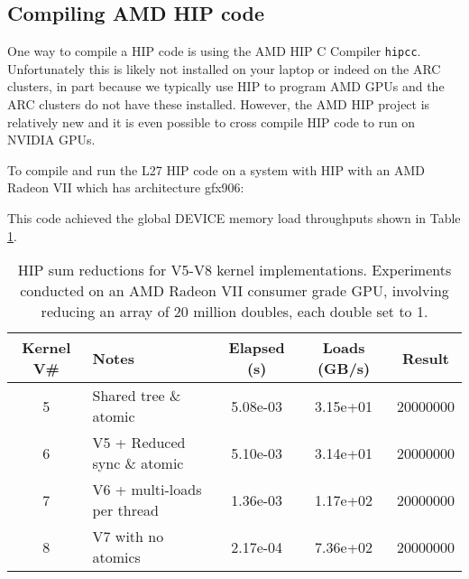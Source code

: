 \subsection{Compiling AMD HIP code}

One way to compile a HIP code is using the AMD HIP C Compiler \texttt{hipcc}. Unfortunately this is likely not installed on your laptop or indeed on the ARC clusters, in part because we typically use HIP to program AMD GPUs and the ARC clusters do not have these installed. However, the AMD HIP project is relatively new and it is even possible to cross compile HIP code to run on NVIDIA GPUs.

To compile and run the L27 HIP code on a system with HIP with an AMD Radeon VII which has architecture gfx906:

 
This code achieved the global DEVICE memory load throughputs shown in Table \ref{HIPreductionsPerformanceRadeonVII.tab}.  
\begin{table}[htbp!]
    \centering
    \begin{tabular}{c|l|c|c|c} \hline
    Kernel V\# & Notes & Elapsed (s) & Loads (GB/s) & Result \\ \hline
5 &  Shared tree \& atomic & 5.08e-03 &   3.15e+01 &   20000000 \\ 
6 &  V5 + Reduced sync \& atomic & 5.10e-03 &   3.14e+01 &   20000000 \\ 
7 &  V6 + multi-loads per thread & 1.36e-03 &   1.17e+02 &   20000000 \\ 
8 &  V7 with no atomics & 2.17e-04 &   7.36e+02 &   20000000 \\ 
  \hline
    \end{tabular}
    \caption{HIP sum reductions for V5-V8 kernel implementations. Experiments conducted on an AMD Radeon VII consumer grade GPU, involving reducing an array of 20 million doubles, each double set to 1.}
    \label{HIPreductionsPerformanceRadeonVII.tab}
\end{table}


